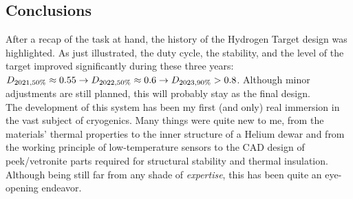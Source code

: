 \begin{refsection}
\section{Conclusions}
    After a recap of the task at hand, the history of the Hydrogen Target design was highlighted. As just illustrated, the duty cycle, the stability, and the level of the target improved significantly during these three years: $D_{2021, 50\%}\approx 0.55 \rightarrow D_{2022, 50\%}\approx0.6 \rightarrow D_{2023, 90\%}>0.8$. Although minor adjustments are still planned, this will probably stay as the final design.\\

    \noindent
    The development of this system has been my first (and only) real immersion in the vast subject of cryogenics. 
    Many things were quite new to me, from the materials' thermal properties to the inner structure of a Helium dewar and from the working principle of low-temperature sensors to the CAD design of peek/vetronite parts required for structural stability and thermal insulation.
    Although being still far from any shade of \textit{expertise}, this has been quite an eye-opening endeavor.


\end{refsection}
